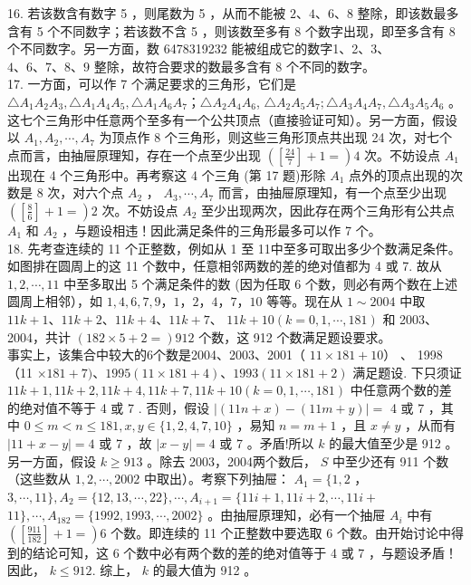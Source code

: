 \documentclass[10pt]{article}
\begin{document}
16. 若该数含有数字 5 ，则尾数为 5 ，从而不能被 $2 、 4 、 6 、 8$ 整除，即该数最多含有 5 个不同数字；若该数不含 5 ，则该数至多有 8 个数字出现，即至多含有 8 个不同数字。另一方面，数 6478319232 能被组成它的数字1、2、3、 $4 、 6 、 7 、 8 、 9$ 整除，故符合要求的数最多含有 8 个不同的数字。\\
17. 一方面，可以作 7 个满足要求的三角形，它们是 $\triangle A_{1} A_{2} A_{3}, \triangle A_{1} A_{4} A_{5}, \triangle A_{1} A_{6} A_{7} ； \triangle A_{2} A_{4} A_{6}$, $\triangle A_{2} A_{5} A_{7} ; \triangle A_{3} A_{4} A_{7}, \triangle A_{3} A_{5} A_{6}$ 。这七个三角形中任意两个至多有一个公共顶点（直接验证可知）。另一方面，假设以 $A_{1}, A_{2}, \cdots, A_{7}$ 为顶点作 8 个三角形，则这些三角形顶点共出现 24 次，对七个点而言，由抽屉原理知，存在一个点至少出现 $\left(\left[\frac{24}{7}\right]+1=\right) 4$ 次。不妨设点 $A_{1}$ 出现在 4 个三角形中。再考察这 4 个三角 (第 17 题)形除 $A_{1}$ 点外的顶点出现的次数是 8 次，对六个点 $A_{2}$ ， $A_{3}, \cdots, A_{7}$ 而言，由抽屉原理知，有一个点至少出现 $\left(\left[\frac{8}{6}\right]+1=\right) 2$ 次。不妨设点 $A_{2}$ 至少出现两次，因此存在两个三角形有公共点 $A_{1}$ 和 $A_{2}$ ，与题设相违！因此满足条件的三角形最多可以作 7 个。\\
18. 先考查连续的 11 个正整数，例如从 1 至 11中至多可取出多少个数满足条件。如图排在圆周上的这 11 个数中，任意相邻两数的差的绝对值都为 4 或 7. 故从 $1,2, \cdots, 11$ 中至多取出 5 个满足条件的数 (因为任取 6 个数，则必有两个数在上述圆周上相邻），如 $1,4,6,7,9 ， 1 ， 2 ， 4 ， 7 ， 10$ 等等。现在从 $1 \sim 2004$ 中取 $11 k+1 、 11 k+2 、 11 k+4 、 11 k+7 、$ $11 k+10(k=0,1, \cdots, 181)$ 和 2003、2004，共计 $(182 \times 5+2=) 912$ 个数，这 912 个数满足题设要求。\\
事实上，该集合中较大的6个数是2004、2003、2001（ $11 \times 181+10 ）$ 、 1998（11 $\times 181+7) 、 1995(11 \times 181+4) 、 1993(11 \times 181+2)$ 满足题设. 下只须证 $11 k+1,11 k+2,11 k+4,11 k+7,11 k+10(k=0,1, \cdots, 181)$ 中任意两个数的差的绝对值不等于 4 或 7 . 否则，假设 $|(11 n+x)-(11 m+y)|=$ 4 或 7 ，其中 $0 \leqslant m<n \leqslant 181, x, y \in\{1,2,4,7,10\}$ ，易知 $n=m+1$ ，且 $x \neq y$ ，从而有 $|11+x-y|=4$ 或 7 ，故 $|x-y|=4$ 或 7 。矛盾!所以 $k$ 的最大值至少是 912 。另一方面，假设 $k \geqslant 913$ 。除去 2003，2004两个数后， $S$ 中至少还有 911 个数（这些数从 $1,2, \cdots, 2002$ 中取出）。考察下列抽屉： $A_{1}=\{1,2$ ， $3, \cdots, 11\}, A_{2}=\{12,13, \cdots, 22\}, \cdots, A_{i+1}=\{11 i+1,11 i+2, \cdots, 11 i+$ $11\}, \cdots, A_{182}=\{1992,1993, \cdots, 2002\}$ 。由抽屉原理知，必有一个抽屉 $A_{i}$ 中有 $\left(\left[\frac{911}{182}\right]+1=\right) 6$ 个数。即连续的 11 个正整数中要选取 6 个数。由开始讨论中得到的结论可知，这 6 个数中必有两个数的差的绝对值等于 4 或 7 ，与题设矛盾！因此， $k \leqslant 912$. 综上， $k$ 的最大值为 912 。\\
\end{document}
